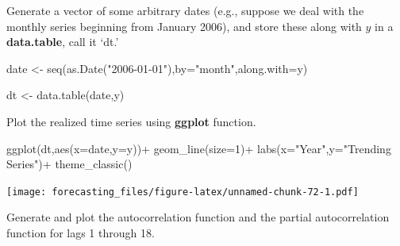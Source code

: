 \documentclass[
  12pt,
  oneside]{book}
\newenvironment{Shaded}{\begin{snugshade}}{\end{snugshade}}
\newcommand{\AttributeTok}[1]{\textcolor[rgb]{0.77,0.63,0.00}{#1}}
\newcommand{\DecValTok}[1]{\textcolor[rgb]{0.00,0.00,0.81}{#1}}
\newcommand{\FunctionTok}[1]{\textcolor[rgb]{0.00,0.00,0.00}{#1}}
\newcommand{\NormalTok}[1]{#1}
\newcommand{\OtherTok}[1]{\textcolor[rgb]{0.56,0.35,0.01}{#1}}
\newcommand{\SpecialCharTok}[1]{\textcolor[rgb]{0.00,0.00,0.00}{#1}}
\newcommand{\StringTok}[1]{\textcolor[rgb]{0.31,0.60,0.02}{#1}}
\begin{document}
Generate a vector of some arbitrary dates (e.g., suppose we deal with the monthly series beginning from January 2006), and store these along with \(y\) in a \textbf{data.table}, call it `dt.'

\begin{Shaded}
\begin{Highlighting}[]
\NormalTok{date }\OtherTok{\textless{}{-}} \FunctionTok{seq}\NormalTok{(}\FunctionTok{as.Date}\NormalTok{(}\StringTok{"2006{-}01{-}01"}\NormalTok{),}\AttributeTok{by=}\StringTok{"month"}\NormalTok{,}\AttributeTok{along.with=}\NormalTok{y)}

\NormalTok{dt }\OtherTok{\textless{}{-}} \FunctionTok{data.table}\NormalTok{(date,y)}
\end{Highlighting}
\end{Shaded}

Plot the realized time series using \textbf{ggplot} function.

\begin{Shaded}
\begin{Highlighting}[]
\FunctionTok{ggplot}\NormalTok{(dt,}\FunctionTok{aes}\NormalTok{(}\AttributeTok{x=}\NormalTok{date,}\AttributeTok{y=}\NormalTok{y))}\SpecialCharTok{+}
  \FunctionTok{geom\_line}\NormalTok{(}\AttributeTok{size=}\DecValTok{1}\NormalTok{)}\SpecialCharTok{+}
  \FunctionTok{labs}\NormalTok{(}\AttributeTok{x=}\StringTok{"Year"}\NormalTok{,}\AttributeTok{y=}\StringTok{"Trending Series"}\NormalTok{)}\SpecialCharTok{+}
  \FunctionTok{theme\_classic}\NormalTok{()}
\end{Highlighting}
\end{Shaded}

\texttt{[image: forecasting\_files/figure-latex/unnamed-chunk-72-1.pdf]}

Generate and plot the autocorrelation function and the partial autocorrelation function for lags 1 through 18.
\end{document}
